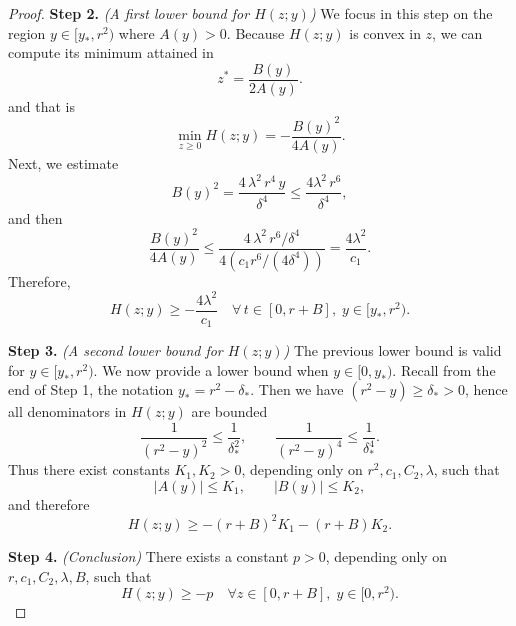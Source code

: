 \documentclass[12pt]{amsart}
\numberwithin{equation}{section}
\begin{document}
\begin{proof}
\textbf{Step 2.} \textit{(A first lower bound for $H(z;y)$)} 
We focus in this step on the region $y \in [y_*, r^{2})$ where $A(y)>0$. Because $H(z;y)$ is convex in $z$, we can compute its minimum attained in 
\begin{equation*}
    z^{*} = \frac{B(y)}{2 A(y)}.
\end{equation*}
and that is
\begin{equation*}
    \min_{z\geq 0} H(z;y) = -\frac{B(y)^2}{4A(y)}.
\end{equation*}
Next, we estimate
\begin{equation*}
    B(y)^2 = \frac{4\,\lambda^2\, r^4\, y}{\delta^4} \leq \frac{4\lambda^2\, r^6}{\delta^4},
\end{equation*}
and then 
\begin{equation*}
    \frac{B(y)^2}{4A(y)} \leq \frac{4\,\lambda^2\, r^6 / \delta^4}{4 (c_{1} r^6 / (4\delta^4))}= \frac{4\lambda^2}{c_{1}}.
\end{equation*}
Therefore,
\begin{equation*}
    H(z;y) \geq -\frac{4\lambda^2}{c_{1}} \quad \forall \, t\in[0,r+B],\; y\in[y_*,r^{2}).
\end{equation*}



\textbf{Step 3.} \textit{(A second lower bound for $H(z;y)$)} 
The previous lower bound is valid for $y\in [y_*,r^{2})$. We now provide a lower bound when $y\in [0,y_{*})$. Recall from the end of Step 1, the notation $y_{*} = r^{2} - \delta_{*}$. Then we have $(r^{2}-y) \geq \delta_*>0$,  hence all denominators in $H(z;y)$ are bounded 
\begin{equation*}
    \frac{1}{(r^{2}-y)^2} \leq \frac{1}{\delta_*^2},
    \qquad
    \frac{1}{(r^{2}-y)^4} \leq \frac{1}{\delta_*^4}.
\end{equation*}
Thus there exist constants $K_1,K_2>0$, depending only on
$r^{2},c_{1},C_{2},\lambda$, such that
\begin{equation*}
    |A(y)| \leq K_1, \qquad |B(y)| \leq K_2,
\end{equation*}
and therefore
\begin{equation*}
    H(z;y) \geq -(r+B)^2 K_1 - (r+B) K_2.
\end{equation*}


\textbf{Step 4.} \textit{(Conclusion)} 
There exists a constant $p>0$, depending only on
$r,c_{1},C_{2},\lambda,B$, such that
\begin{equation*}
    H(z;y) \geq -p \quad \forall z\in[0,r+B],\; y\in[0,r^{2}).
\end{equation*}


\end{proof}
\end{document}
